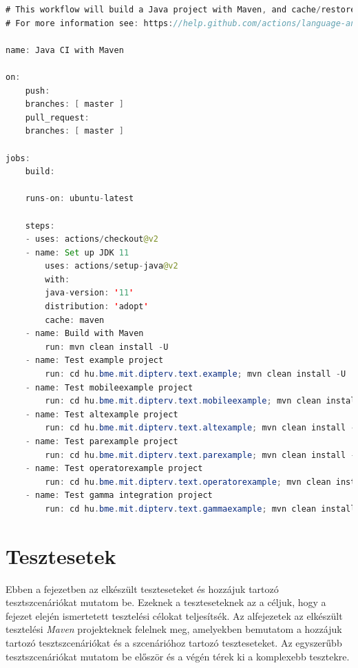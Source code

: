 \begin{lstlisting}[language=java, frame=single, float=ht!, caption={\textit{Github Actions CI}-hoz tartozó \textit{.yml script}.},captionpos=b,label=ci_script]
# This workflow will build a Java project with Maven, and cache/restore any dependencies to improve the workflow execution time
# For more information see: https://help.github.com/actions/language-and-framework-guides/building-and-testing-java-with-maven

name: Java CI with Maven

on:
    push:
    branches: [ master ]
    pull_request:
    branches: [ master ]

jobs:
    build:

    runs-on: ubuntu-latest

    steps:
    - uses: actions/checkout@v2
    - name: Set up JDK 11
        uses: actions/setup-java@v2
        with:
        java-version: '11'
        distribution: 'adopt'
        cache: maven
    - name: Build with Maven
        run: mvn clean install -U
    - name: Test example project
        run: cd hu.bme.mit.dipterv.text.example; mvn clean install -U
    - name: Test mobileexample project
        run: cd hu.bme.mit.dipterv.text.mobileexample; mvn clean install -U
    - name: Test altexample project
        run: cd hu.bme.mit.dipterv.text.altexample; mvn clean install -U
    - name: Test parexample project
        run: cd hu.bme.mit.dipterv.text.parexample; mvn clean install -U
    - name: Test operatorexample project
        run: cd hu.bme.mit.dipterv.text.operatorexample; mvn clean install -U
    - name: Test gamma integration project
        run: cd hu.bme.mit.dipterv.text.gammaexample; mvn clean install -U
\end{lstlisting}

\clearpage\section{Tesztesetek}

Ebben a fejezetben az elkészült teszteseteket és hozzájuk tartozó tesztszcenáriókat mutatom be.
Ezeknek a teszteseteknek az a céljuk, hogy a fejezet elején ismertetett tesztelési célokat teljesítsék.
Az alfejezetek az elkészült tesztelési \textit{Maven} projekteknek felelnek meg, amelyekben bemutatom a hozzájuk tartozó tesztszcenáriókat és a szcenárióhoz tartozó teszteseteket.
Az egyszerűbb tesztszcenáriókat mutatom be először és a végén térek ki a komplexebb tesztekre.

